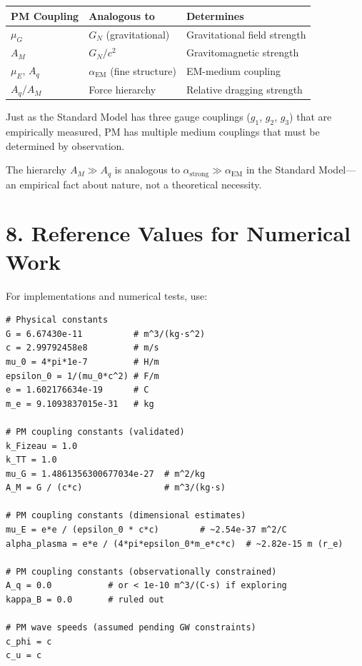 \documentclass{article}
\begin{document}
\begin{center}
\begin{tabular}{lll}
\toprule
\textbf{PM Coupling} & \textbf{Analogous to} & \textbf{Determines} \\
\midrule
$\mu_G$ & $G_N$ (gravitational) & Gravitational field strength \\
$A_M$ & $G_N / c^2$ & Gravitomagnetic strength \\
$\mu_E$, $A_q$ & $\alpha_{\text{EM}}$ (fine structure) & EM-medium coupling \\
$A_q / A_M$ & Force hierarchy & Relative dragging strength \\
\bottomrule
\end{tabular}
\end{center}

Just as the Standard Model has three gauge couplings ($g_1$, $g_2$, $g_3$) that
are empirically measured, PM has multiple medium couplings that must be
determined by observation.

The hierarchy $A_M \gg A_q$ is analogous to $\alpha_{\text{strong}} \gg
\alpha_{\text{EM}}$ in the Standard Model—an empirical fact about nature, not a
theoretical necessity.

\section*{8. Reference Values for Numerical Work}

For implementations and numerical tests, use:

\begin{verbatim}
# Physical constants
G = 6.67430e-11          # m^3/(kg·s^2)
c = 2.99792458e8         # m/s
mu_0 = 4*pi*1e-7         # H/m
epsilon_0 = 1/(mu_0*c^2) # F/m
e = 1.602176634e-19      # C
m_e = 9.1093837015e-31   # kg

# PM coupling constants (validated)
k_Fizeau = 1.0
k_TT = 1.0
mu_G = 1.4861356300677034e-27  # m^2/kg
A_M = G / (c*c)                # m^3/(kg·s)

# PM coupling constants (dimensional estimates)
mu_E = e*e / (epsilon_0 * c*c)        # ~2.54e-37 m^2/C
alpha_plasma = e*e / (4*pi*epsilon_0*m_e*c*c)  # ~2.82e-15 m (r_e)

# PM coupling constants (observationally constrained)
A_q = 0.0           # or < 1e-10 m^3/(C·s) if exploring
kappa_B = 0.0       # ruled out

# PM wave speeds (assumed pending GW constraints)
c_phi = c
c_u = c
\end{verbatim}
\end{document}

